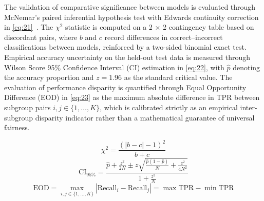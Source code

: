 The validation of comparative significance between models is evaluated through McNemar's paired inferential hypothesis test with Edwards continuity correction in \eqref{eq:21}~\cite{ref44}. The $\chi^2$ statistic is computed on a 2 $\times$ 2 contingency table based on discordant pairs, where $b$ and $c$ record differences in correct--incorrect classifications between models, reinforced by a two-sided binomial exact test. Empirical accuracy uncertainty on the held-out test data is measured through Wilson Score 95\% Confidence Interval (CI) estimation in \eqref{eq:22}, with $\hat{p}$ denoting the accuracy proportion and $z = 1.96$ as the standard critical value. The evaluation of performance disparity is quantified through Equal Opportunity Difference (EOD) in \eqref{eq:23} as the maximum absolute difference in TPR between subgroup pairs $i, j \in \{1, \dots, K\}$, which is calibrated strictly as an empirical inter-subgroup disparity indicator rather than a mathematical guarantee of universal fairness.

\begin{equation}
\chi^2 = \frac{(|b - c| - 1)^2}{b + c}
\label{eq:21}
\end{equation}
\begin{equation}
\text{CI}_{95\%} = \frac{\hat{p} + \frac{z^2}{2N} \pm z \sqrt{\frac{\hat{p}(1-\hat{p})}{N} + \frac{z^2}{4N^2}}}{1 + \frac{z^2}{N}}
\label{eq:22}
\end{equation}
\begin{equation}
\text{EOD} = \max_{i, j \in \{1, \dots, K\}} |\text{Recall}_i - \text{Recall}_j| = \max \text{TPR} - \min \text{TPR}
\label{eq:23}
\end{equation}
